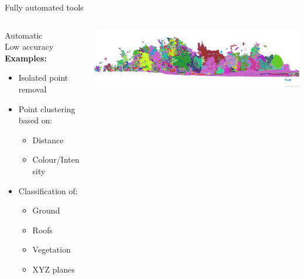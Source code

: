 \documentclass{beamer}
\begin{document}
\begin{frame}{Fully automated tools}

\begin{columns}[T]
\begin{column}{0.5\textwidth}

Automatic\\
Low accuracy\\

\textbf{Examples:}
\begin{itemize}
\item Isolated point removal
\item Point clustering based on:
\begin{itemize}
\item Distance
\item Colour/Intensity
\end{itemize}
\item Classification of:
\begin{itemize}
\item Ground
\item Roofs
\item Vegetation
\item XYZ planes
\end{itemize}

\end{itemize}

\end{column}

\begin{column}{0.5\textwidth}

\includegraphics[width=1\textwidth]{pics/3DReshaper_auto_pt_cloud_seg.jpg}

\end{column}
\end{columns}

\end{frame}
\end{document}
